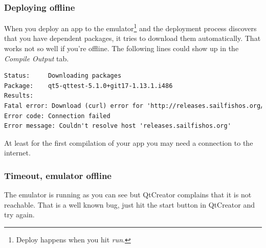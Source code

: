 \subsubsection{Deploying offline}
%
When you deploy an app to the emulator\footnote{Deploy happens when you hit \emph{run}.} and the deployment process discovers that you have dependent packages, it tries to download them automatically. That works not so well if you're offline. The following lines could show up in the \emph{Compile Output} tab.
%
\begin{lstlisting}[language=tex]
Status: 	Downloading packages
Package:	qt5-qttest-5.1.0+git17-1.13.1.i486
Results:
Fatal error: Download (curl) error for 'http://releases.sailfishos.org/sdk/latest/jolla/i486/qt/i486/qt5-qttest-5.1.0+git17-1.13.1.i486.rpm':
Error code: Connection failed
Error message: Couldn't resolve host 'releases.sailfishos.org'
\end{lstlisting}
%
At least for the first compilation of your app you may need a connection to the internet.
%
%
\subsubsection{Timeout, emulator offline}
%
The emulator is running as you can see but QtCreator complains that it is not reachable. That is a well known bug, just hit the start button in QtCreator and try again.
%